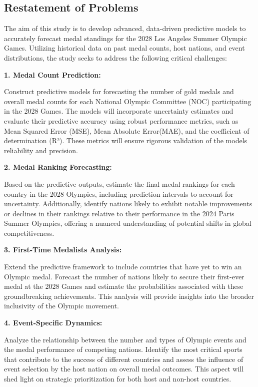 \documentclass[12pt,a4paper]{article}
\begin{document}
    \subsection{Restatement of Problems}
    
    The aim of this study is to develop advanced, data-driven
    predictive models to accurately forecast medal standings for the 2028
    Los Angeles Summer Olympic Games. Utilizing historical data on past
    medal counts, host nations, and event distributions, the study seeks to
    address the following critical challenges:
    
    \textbf{1. Medal Count Prediction:}
    
    Construct predictive models for forecasting the number of gold
    medals and overall medal counts for each National Olympic Committee
    (NOC) participating in the 2028 Games. The models will incorporate
    uncertainty estimates and evaluate their predictive accuracy using
    robust performance metrics, such as Mean Squared Error (MSE), Mean
    Absolute Error(MAE), and the coefficient of determination (R²). These metrics
    will ensure rigorous validation of the models\textquotesingle{}
    reliability and precision.
    
    \textbf{2. Medal Ranking Forecasting:}
    
    Based on the predictive outputs, estimate the final medal
    rankings for each country in the 2028 Olympics, including prediction
    intervals to account for uncertainty. Additionally, identify nations
    likely to exhibit notable improvements or declines in their rankings
    relative to their performance in the 2024 Paris Summer Olympics,
    offering a nuanced understanding of potential shifts in global
    competitiveness.
    
    
    \textbf{3. First-Time Medalists Analysis:}
    
    Extend the predictive framework to include countries that have
    yet to win an Olympic medal. Forecast the number of nations likely to
    secure their first-ever medal at the 2028 Games and estimate the
    probabilities associated with these groundbreaking achievements. This
    analysis will provide insights into the broader inclusivity of the
    Olympic movement.
    
    \textbf{4. Event-Specific Dynamics:}
    
    Analyze the relationship between the number and types of Olympic
    events and the medal performance of competing nations. Identify the most
    critical sports that contribute to the success of different countries
    and assess the influence of event selection by the host nation on
    overall medal outcomes. This aspect will shed light on strategic
    prioritization for both host and non-host countries.
    
\end{document}
